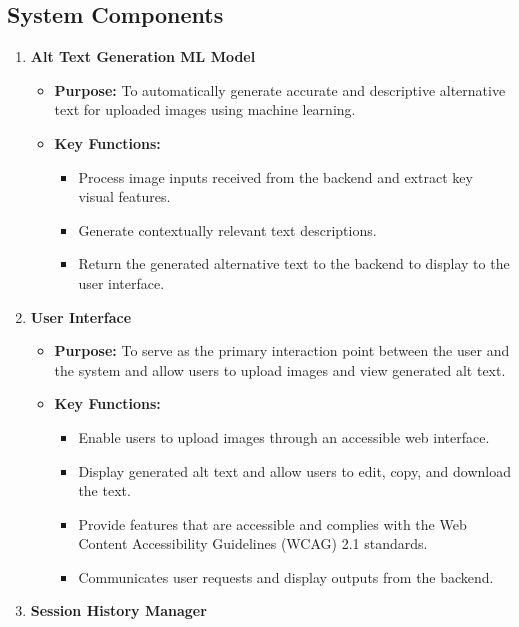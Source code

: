\documentclass{article}
\begin{document}
\subsection{System Components}
\begin{enumerate}
  \item \textbf{Alt Text Generation ML Model}
    \begin{itemize}
      \item \textbf{Purpose:} To automatically generate accurate and
        descriptive alternative text for uploaded images using machine learning.
      \item \textbf{Key Functions:}
        \begin{itemize}
          \item Process image inputs received from the backend and
            extract key visual features.
          \item Generate contextually relevant text descriptions.
          \item Return the generated alternative text to the backend
            to display to the user interface.
        \end{itemize}
    \end{itemize}
  \item \textbf{User Interface}
    \begin{itemize}
      \item \textbf{Purpose:} To serve as the primary interaction
        point between the user and the system and allow users to
        upload images and view generated alt text.
      \item \textbf{Key Functions:}
        \begin{itemize}
          \item Enable users to upload images through an accessible
            web interface.
          \item Display generated alt text and allow users to edit,
            copy, and download the text.
          \item Provide features that are accessible and complies
            with the Web Content Accessibility Guidelines (WCAG) 2.1 standards.
          \item Communicates user requests and display outputs from the backend.
        \end{itemize}
    \end{itemize}
  \item \textbf{Session History Manager}
    \begin{itemize}

\end{itemize}
\end{enumerate}
\end{document}
